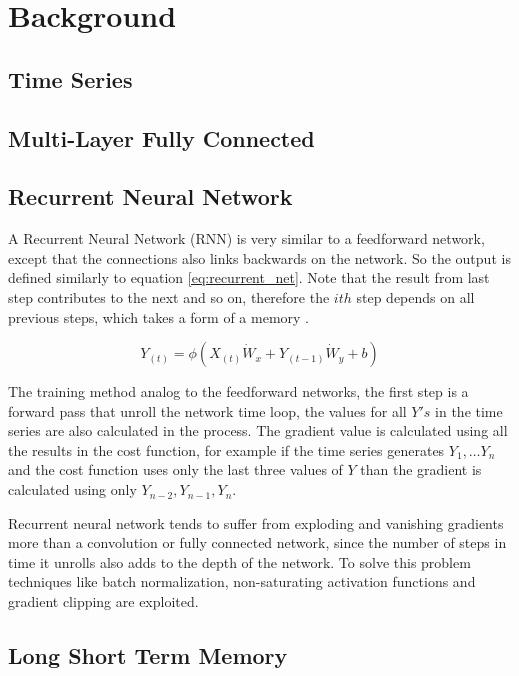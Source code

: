 \section{Background}
\label{sec:background}

\subsection{Time Series}

\subsection{Multi-Layer Fully Connected}

\subsection{Recurrent Neural Network}

A Recurrent Neural Network (RNN) is very similar to a feedforward network, 
except that the connections also links backwards on the network.
So the output is defined similarly to equation \ref{eq:recurrent_net}.
Note that the result from last step contributes to the next and so on,
therefore the $ith$ step depends on all previous steps,
which takes a form of a memory \cite{geron2017hands}.

\begin{equation}
\label{eq:recurrent_net}
Y_{(t)} = \phi(X_{(t)} \dot W_x + Y_{(t-1)} \dot W_y + b)
\end{equation}

The training method analog to the feedforward networks,
the first step is a forward pass that unroll the network time loop,
the values for all $Y's$ in the time series are also calculated in the process.
The gradient value is calculated using all the results in the cost function,
for example if the time series generates $Y_1, \dots Y_n$ and the cost function uses only the last three values of $Y$ than the gradient is calculated using only $Y_{n-2}, Y_{n-1} , Y_n$.

Recurrent neural network tends to suffer from exploding and vanishing gradients more than a convolution or fully connected network,
since the number of steps in time it unrolls also adds to the depth of the network.
To solve this problem techniques like batch normalization, non-saturating activation functions and gradient clipping are exploited. 

\subsection{Long Short Term Memory}
